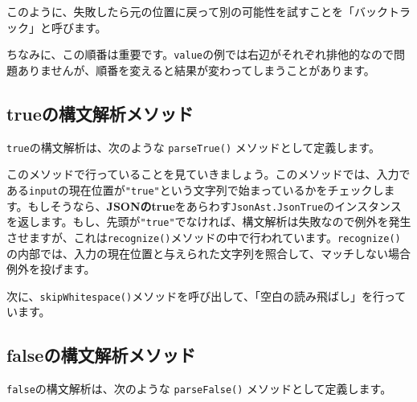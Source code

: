 このように、失敗したら元の位置に戻って別の可能性を試すことを「バックトラック」と呼びます。

ちなみに、この順番は重要です。\texttt{value}の例では右辺がそれぞれ排他的なので問題ありませんが、順番を変えると結果が変わってしまうことがあります。

\hypertarget{chapter3-trueux306eux69cbux6587ux89e3ux6790ux30e1ux30bdux30c3ux30c9}{%
\subsection{trueの構文解析メソッド}\label{chapter3-trueux306eux69cbux6587ux89e3ux6790ux30e1ux30bdux30c3ux30c9}}

\texttt{true}の構文解析は、次のような \texttt{parseTrue()}
メソッドとして定義します。

\begin{Shaded}
\begin{Highlighting}[]
 \NormalTok{() \{}
    \NormalTok{(}\NormalTok{);}
    \NormalTok{();}
     \NormalTok{();}
\NormalTok{\}}
\end{Highlighting}
\end{Shaded}

このメソッドで行っていることを見ていきましょう。このメソッドでは、入力である\texttt{input}の現在位置が\texttt{"true"}という文字列で始まっているかをチェックします。もしそうなら、\textbf{JSONのtrue}をあらわす\texttt{JsonAst.JsonTrue}のインスタンスを返します。もし、先頭が\texttt{"true"}でなければ、構文解析は失敗なので例外を発生させますが、これは\texttt{recognize()}メソッドの中で行われています。\texttt{recognize()}の内部では、入力の現在位置と与えられた文字列を照合して、マッチしない場合例外を投げます。

次に、\texttt{skipWhitespace()}メソッドを呼び出して、「空白の読み飛ばし」を行っています。

\hypertarget{chapter3-falseux306eux69cbux6587ux89e3ux6790ux30e1ux30bdux30c3ux30c9}{%
\subsection{falseの構文解析メソッド}\label{chapter3-falseux306eux69cbux6587ux89e3ux6790ux30e1ux30bdux30c3ux30c9}}

\texttt{false}の構文解析は、次のような \texttt{parseFalse()}
メソッドとして定義します。

